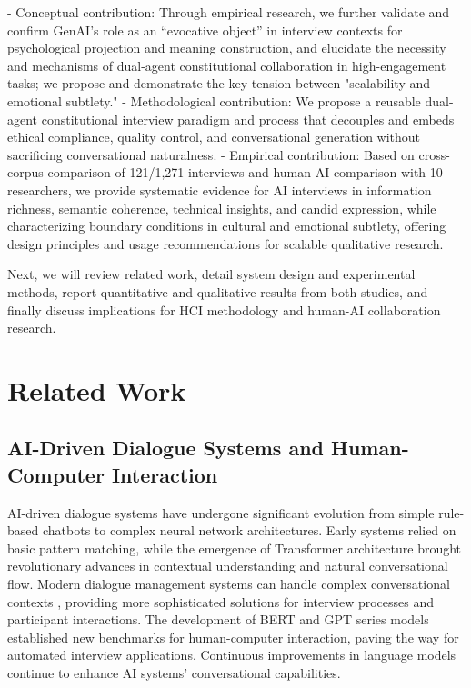 \documentclass[sigchi,nonacm,manuscript]{acmart}
\begin{document}
- Conceptual contribution: Through empirical research, we further validate and confirm GenAI's role as an ``evocative object'' in interview contexts for psychological projection and meaning construction, and elucidate the necessity and mechanisms of dual-agent constitutional collaboration in high-engagement tasks; we propose and demonstrate the key tension between "scalability and emotional subtlety."
- Methodological contribution: We propose a reusable dual-agent constitutional interview paradigm and process that decouples and embeds ethical compliance, quality control, and conversational generation without sacrificing conversational naturalness.
- Empirical contribution: Based on cross-corpus comparison of 121/1,271 interviews and human-AI comparison with 10 researchers, we provide systematic evidence for AI interviews in information richness, semantic coherence, technical insights, and candid expression, while characterizing boundary conditions in cultural and emotional subtlety, offering design principles and usage recommendations for scalable qualitative research.

Next, we will review related work, detail system design and experimental methods, report quantitative and qualitative results from both studies, and finally discuss implications for HCI methodology and human-AI collaboration research.


\section{Related Work}


\subsection{AI-Driven Dialogue Systems and Human-Computer Interaction}

AI-driven dialogue systems have undergone significant evolution from simple rule-based chatbots to complex neural network architectures. Early systems relied on basic pattern matching, while the emergence of Transformer architecture \citep{vaswani2017attention} brought revolutionary advances in contextual understanding and natural conversational flow. Modern dialogue management systems can handle complex conversational contexts \citep{brabraDialogueManagementConversational2022}, providing more sophisticated solutions for interview processes and participant interactions. The development of BERT \citep{devlin2018bert} and GPT series models \citep{brown2020language} established new benchmarks for human-computer interaction, paving the way for automated interview applications. Continuous improvements in language models \citep{borgeaudImprovingLanguageModels2022} continue to enhance AI systems' conversational capabilities.
\end{document}
